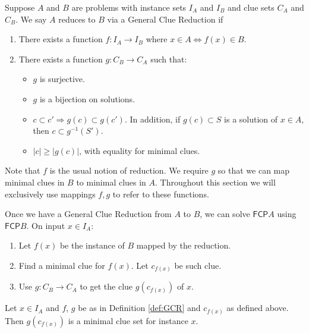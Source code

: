 \documentclass[runningheads,a4paper]{llncs}
\begin{document}
\begin{definition}\label{def:GCR}
Suppose $A$ and $B$ are problems with instance sets $I_A$ and $I_B$ and clue sets $C_A$ and $C_B$. We say $A$ reduces to $B$ via a General Clue Reduction if
\begin{enumerate}
\item There exists a function $f: I_A \rightarrow I_B$ where $x \in A \iff f(x) \in B$.
\item There exists a function $g: C_B \rightarrow C_A$ such that:
\begin{itemize}
\item $g$ is surjective. 
\item $g$ is a bijection on solutions.
\item $c \subset c' \Rightarrow g(c) \subset g(c')$. In addition, if $g(c) \subset S$ is a solution of $x \in A$, then $c \subset g^{-1}(S')$.
\item $|c| \geq |g(c)|$, with equality for minimal clues. 
\end{itemize}
\end{enumerate}
\end{definition}
Note that $f$ is the usual notion of reduction. We require $g$ so that we can map minimal clues in $B$ to minimal clues in $A$. Throughout this section we will exclusively use mappings $f, g$ to refer to these functions. 

Once we have a General Clue Reduction from $A$ to $B$, we can solve $\mathsf{FCP} A$ using $\mathsf{FCP} B$. On input $x \in I_A$:
\begin{enumerate}
\item Let $f(x)$ be the instance of $B$ mapped by the reduction.
\item Find a minimal clue for $f(x)$. Let $c_{f(x)}$ be such clue. 
\item Use $g: C_B \rightarrow C_A$ to get the clue $g(c_{f(x)})$ of $x$.
\end{enumerate}

\begin{lemma}\label{lemmaMinClue}
Let $x \in I_A$ and $f$, $g$ be as in Definition \ref{def:GCR} and $c_{f(x)}$ as defined above. Then $g(c_{f(x)})$ is a minimal clue set for instance $x$.
\end{lemma}
\end{document}
